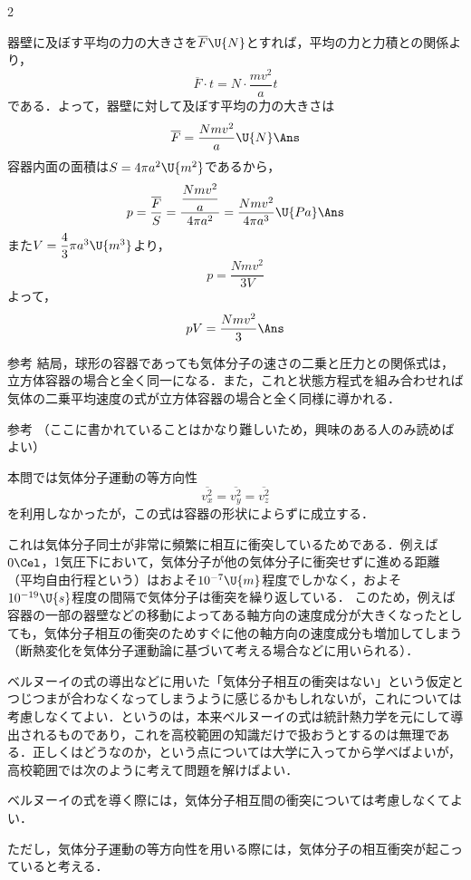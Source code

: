 \begin{multicols}{2}
\begin{komon}
 器壁に及ぼす平均の力の大きさを$\overline{F}\U{N}$とすれば，平均の力と力積との関係より，
       \[\overline{F}\cdot t=N\cdot\frac{mv^2}{a}t\]
       である．よって，器壁に対して及ぼす平均の力の大きさは
       \[\overline{F}=\frac{Nmv^2}{a}\U{N}\Ans\]
 容器内面の面積は$S=4\pi a^2\U{m^2}$であるから，
       \[p=\frac{\overline{F}}{S}=\frac{\dfrac{Nmv^2}{a}}{4\pi a^2}=\frac{Nmv^2}{4\pi a^3}\U{Pa}\Ans\]
 また$V=\dfrac{4}{3}\pi a^3\U{m^3}$より，
       \[p=\frac{Nmv^2}{3V}\]
       よって，
       \[pV=\frac{Nmv^2}{3}\Ans\]
\end{komon}
\begin{bsHosoku}{参考}
結局，球形の容器であっても気体分子の速さの二乗と圧力との関係式は，立方体容器の場合と全く同一になる．また，これと状態方程式を組み合わせれば気体の二乗平均速度の式が立方体容器の場合と全く同様に導かれる．
\end{bsHosoku}
\begin{bsHosoku}{参考}
（ここに書かれていることはかなり難しいため，興味のある人のみ読めばよい）\par
\hspace*{1zw}本問では気体分子運動の等方向性
\[\overline{v_x^2}=\overline{v_y^2}=\overline{v_z^2}\]
を利用しなかったが，この式は容器の形状によらずに成立する．\par
\hspace*{1zw}これは気体分子同士が非常に頻繁に相互に衝突しているためである．例えば$0\Cel$，1気圧下において，気体分子が他の気体分子に衝突せずに進める距離（平均自由行程という）はおよそ$10^{-7}\U{m}$程度でしかなく，およそ$10^{-19}\U{s}$程度の間隔で気体分子は衝突を繰り返している．
このため，例えば容器の一部の器壁などの移動によってある軸方向の速度成分が大きくなったとしても，気体分子相互の衝突のためすぐに他の軸方向の速度成分も増加してしまう（断熱変化を気体分子運動論に基づいて考える場合などに用いられる）．\par
\hspace*{1zw}ベルヌーイの式の導出などに用いた「気体分子相互の衝突はない」という仮定とつじつまが合わなくなってしまうように感じるかもしれないが，これについては考慮しなくてよい．というのは，本来ベルヌーイの式は統計熱力学を元にして導出されるものであり，これを高校範囲の知識だけで扱おうとするのは無理である．正しくはどうなのか，という点については大学に入ってから学べばよいが，高校範囲では次のように考えて問題を解けばよい．
\begin{komon}
\item[{\makebox[1.9zw][r]{\MARU{1}}}] ベルヌーイの式を導く際には，気体分子相互間の衝突については考慮しなくてよい．
\item[{\makebox[1.9zw][r]{\MARU{2}}}] ただし，気体分子運動の等方向性を用いる際には，気体分子の相互衝突が起こっていると考える．
\end{komon}
\end{bsHosoku}


\end{multicols}
